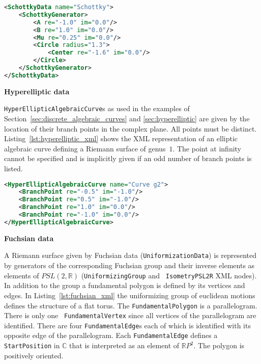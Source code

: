 \documentclass[Thesis.tex]{subfiles}
\begin{document}
\begin{lstlisting}[label=lst:schottky_xml, caption={A torus given by Schottky data}, 
numbers=none, language=XML, captionpos=b]
<SchottkyData name="Schottky">
	<SchottkyGenerator>
		<A re="-1.0" im="0.0"/>
		<B re="1.0" im="0.0"/>
		<Mu re="0.25" im="0.0"/>
		<Circle radius="1.3">
			<Center re="-1.6" im="0.0"/>
		</Circle>
	</SchottkyGenerator>
</SchottkyData>
\end{lstlisting}

{\bf Hyperelliptic data} 

{\tt HyperEllipticAlgebraicCurve}s as used in the examples of
Section~\ref{sec:discrete_algebraic_curves} and \ref{sec:hyperelliptic} are
given by the location of their branch points in the complex plane. All points
must be distinct. Listing~\ref{lst:hyperelliptic_xml} shows the XML
representation of an elliptic algebraic curve defining a Riemann surface of
genus~$1$. The point at infinity cannot be specified and is implicitly given if
an odd number of branch points is listed.

\begin{lstlisting}[label=lst:hyperelliptic_xml, caption={A torus given as 
hyperelliptic data}, numbers=none, language=XML, captionpos=b]
<HyperEllipticAlgebraicCurve name="Curve g2">
	<BranchPoint re="-0.5" im="-1.0"/>
	<BranchPoint re="0.5" im="-1.0"/>
	<BranchPoint re="1.0" im="0.0"/>
	<BranchPoint re="-1.0" im="0.0"/>
</HyperEllipticAlgebraicCurve>
\end{lstlisting}

{\bf Fuchsian data}

A Riemann surface given by Fuchsian data ({\tt UniformizationData}) is
represented by generators of the corresponding Fuchsian group and their inverse
elements as elements of $PSL(2,\mathbb R)$ ({\tt UniformizingGroup} and {\tt
IsometryPSL2R} XML nodes). In addition to the group a fundamental polygon is
defined by its vertices and edges. In Listing~\ref{lst:fuchsian_xml} the
uniformizing group of euclidean motions defines the structure of a flat torus.
The {\tt FundamentalPolygon} is a parallelogram. There is only one {\tt
FundamentalVertex} since all vertices of the parallelogram are identified.
There are four {\tt FundamentalEdge}s each of which is identified with its
opposite edge of the parallelogram. Each {\tt FundamentalEdge} defines a {\tt
StartPosition} in $\mathbb C$ that is interpreted as an element of $\mathbb R
P^2$. The polygon is positively oriented.
\end{document}

